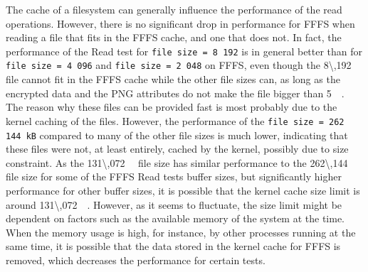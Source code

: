 The cache of a filesystem can generally influence the performance of the read operations. However, there is no significant drop in performance for \gls{FFFS} when reading a file that fits in the \gls{FFFS} cache, and one that does not. In fact, the performance of the Read test for \texttt{file size = 8\,192} is in general better than for \texttt{file size = 4\,096} and \texttt{file size = 2\,048} on \gls{FFFS}, even though the \SI{8\,192}{\kilo\byte} file cannot fit in the \gls{FFFS} cache while the other file sizes can, as long as the encrypted data and the PNG attributes do not make the file bigger than \SI[per-mode = symbol]{5}{\mega\byte}. The reason why these files can be provided fast is most probably due to the kernel caching of the files. However, the performance of the \texttt{file size = 262\,144\,kB} compared to many of the other file sizes is much lower, indicating that these files were not, at least entirely, cached by the kernel, possibly due to size constraint. As the \SI[per-mode = symbol]{131\,072}{\kilo\byte} file size has similar performance to the \SI[per-mode = symbol]{262\,144}{\kilo\byte} file size for some of the \gls{FFFS} Read tests buffer sizes, but significantly higher performance for other buffer sizes, it is possible that the kernel cache size limit is around \SI[per-mode = symbol]{131\,072}{\kilo\byte}. However, as it seems to fluctuate, the size limit might be dependent on factors such as the available memory of the system at the time. When the memory usage is high, for instance, by other processes running at the same time, it is possible that the data stored in the kernel cache for \gls{FFFS} is removed, which decreases the performance for certain tests. 

